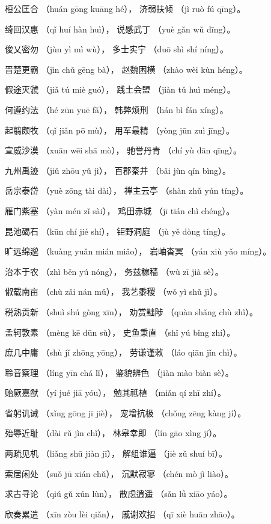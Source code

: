 \documentclass[12pt]{article}%
\begin{document}
\begin{appendices}
\begin{subappendix}
\begin{center}
桓公匡合 （huán gōng kuāng hé）， 济弱扶倾 （jì ruò fú qīng）。

绮回汉惠 （qǐ huí hàn huì）， 说感武丁 （yuè gǎn wǔ dīng）。

俊乂密勿 （jùn yì mì wù）， 多士实宁 （duō shì shí níng）。

晋楚更霸 （jìn chǔ gēng bà）， 赵魏困横 （zhào wèi kùn héng）。

假途灭虢 （jiǎ tú miè guó）， 践土会盟 （jiàn tǔ huì méng）。

何遵约法 （hé zūn yuē fǎ）， 韩弊烦刑 （hán bì fán xíng）。

起翦颇牧 （qǐ jiǎn pō mù）， 用军最精 （yòng jūn zuì jīng）。

宣威沙漠 （xuān wēi shā mò）， 驰誉丹青 （chí yù dān qīng）。

九州禹迹 （jiǔ zhōu yǔ jì）， 百郡秦并 （bǎi jùn qín bìng）。

岳宗泰岱 （yuè zōng tài dài）， 禅主云亭 （shàn zhǔ yún tíng）。

雁门紫塞 （yàn mén zǐ sài）， 鸡田赤城 （jī tián chì chéng）。

昆池碣石 （kūn chí jié shí）， 钜野洞庭 （jù yě dòng tíng）。

旷远绵邈 （kuàng yuǎn mián miǎo）， 岩岫杳冥 （yán xiù yǎo míng）。

治本于农 （zhì běn yú nóng）， 务兹稼穑 （wù zī jià sè）。

俶载南亩 （chù zǎi nán mǔ）， 我艺黍稷 （wǒ yì shǔ jì）。

税熟贡新 （shuì shú gòng xīn）， 劝赏黜陟 （quàn shǎng chù zhì）。

孟轲敦素 （mèng kē dūn sù）， 史鱼秉直 （shǐ yú bǐng zhí）。

庶几中庸 （shù jǐ zhōng yōng）， 劳谦谨敕 （láo qiān jǐn chì）。

聆音察理 （líng yīn chá lǐ）， 鉴貌辨色 （jiàn mào biàn sè）。

贻厥嘉猷 （yí jué jiā yóu）， 勉其祗植 （miǎn qí zhī zhí）。

省躬讥诫 （xǐng gōng jī jiè）， 宠增抗极 （chǒng zēng kàng jí）。

殆辱近耻 （dài rǔ jìn chǐ）， 林皋幸即 （lín gāo xìng jí）。

两疏见机 （liǎng shū jiàn jī）， 解组谁逼 （jiè zǔ shuí bī）。

索居闲处 （suǒ jū xián chǔ）， 沉默寂寥 （chén mò jì liào）。

求古寻论 （qiú gǔ xún lùn）， 散虑逍遥 （sǎn lǜ xiāo yáo）。

欣奏累遣 （xīn zòu lèi qiǎn）， 戚谢欢招 （qī xiè huān zhāo）。


\end{center}
\end{subappendix}
\end{appendices}
\end{document}
